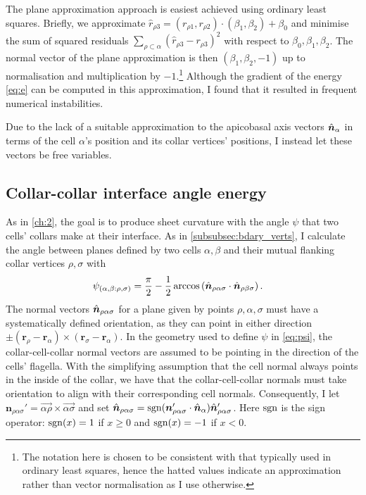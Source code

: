 The plane approximation approach is easiest achieved using ordinary least squares. 
Briefly, we approximate $\hat{r}_{\rho 3} = (r_{\rho 1}, r_{\rho 2}) \cdot (\beta_1, \beta_2) + \beta_0$ and minimise the sum of squared residuals $\sum_{\rho\subset\alpha} (\hat{r}_{\rho 3} - r_{\rho 3})^2$ with respect to $\beta_0, \beta_1, \beta_2$. 
The normal vector of the plane approximation is then $(\beta_1, \beta_2, -1)$ up to normalisation and multiplication by $-1$.\footnote{The notation here is chosen to be consistent with that typically used in ordinary least squares, hence the hatted values indicate an approximation rather than vector normalisation as I use otherwise.} 
Although the gradient of the energy \cref{eq:e} can be computed in this approximation, I found that it resulted in frequent numerical instabilities.

Due to the lack of a suitable approximation to the apicobasal axis vectors $\hat{\bm{n}}_\alpha$ in terms of the cell $\alpha$'s position and its collar vertices' positions, I instead let these vectors be free variables.

\subsection{Collar-collar interface angle energy} \label{subsec:e_psi}

As in \cref{ch:2}, the goal is to produce sheet curvature with the angle $\psi$ that two cells' collars make at their interface. As in \cref{subsubsec:bdary_verts}, I calculate the angle between planes defined by two cells $\alpha, \beta$ and their mutual flanking collar vertices $\rho, \sigma$ with
\begin{align}
	\psi_{(\alpha, \beta: \rho, \sigma)} &= \frac{\pi}{2} - \frac{1}{2}\arccos \left(\hat{\bm{n}}_{\rho\alpha\sigma} \cdot \hat{\bm{n}}_{\rho\beta\sigma} \right). \label{eq:psi}
\end{align}
\noindent The normal vectors $\hat{\bm{n}}_{\rho\alpha\sigma}$ for a plane given by points $\rho, \alpha, \sigma$ must have a systematically defined orientation, as they can point in either direction $\pm (\bm{r}_\rho - \bm{r}_\alpha) \times (\bm{r}_\sigma - \bm{r}_\alpha)$. 
In the geometry used to define $\psi$ in \cref{eq:psi}, the collar-cell-collar normal vectors are assumed to be pointing in the direction of the cells' flagella. 
With the simplifying assumption that the cell normal always points in the inside of the collar, we have that the collar-cell-collar normals must take orientation to align with their corresponding cell normals. 
Consequently, I let $\bm{n}_{\rho\alpha\sigma}' = \vec{\alpha\rho} \times \vec{\alpha\sigma}$ and set $\hat{\bm{n}}_{\rho\alpha\sigma} = \operatorname{sgn} (\bm{n}_{\rho\alpha\sigma}' \cdot \hat{\bm{n}}_\alpha) \hat{\bm{n}}_{\rho\alpha\sigma}'$.
Here $\operatorname{sgn}$ is the sign operator: $\operatorname{sgn}(x) = 1$ if $x \geq 0$ and $\operatorname{sgn}(x) = -1$ if $x < 0$.

